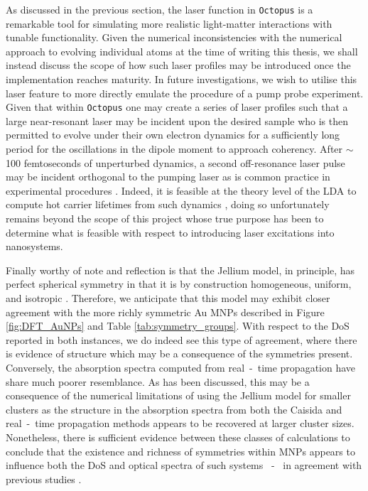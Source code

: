 As discussed in the previous section, the laser function in \texttt{Octopus} is a remarkable tool for simulating more realistic light-matter interactions with tunable functionality. Given the numerical inconsistencies with the numerical approach to evolving individual atoms at the time of writing this thesis, we shall instead discuss the scope of how such laser profiles may be introduced once the implementation reaches maturity. In future investigations, we wish to utilise this laser feature to more directly emulate the procedure of a pump probe experiment. Given that within \texttt{Octopus} one may create a series of laser profiles such that a large near-resonant laser may be incident upon the desired sample who is then permitted to evolve under their own electron dynamics for a sufficiently long period for the oscillations in the dipole moment to approach coherency. After $\sim$ 100 femtoseconds of unperturbed dynamics, a second off-resonance laser pulse may be incident orthogonal to the pumping laser as is common practice in experimental procedures \cite{https://doi.org/10.1002/lpor.202000346}. Indeed, it is feasible at the theory level of the LDA to compute hot carrier lifetimes from such dynamics \cite{https://doi.org/10.1002/lpor.202000346}, doing so unfortunately remains beyond the scope of this project whose true purpose has been to determine what is feasible with respect to introducing laser excitations into nanosystems. 

Finally worthy of note and reflection is that the Jellium model, in principle, has perfect spherical symmetry in that it is by construction homogeneous, uniform, and isotropic \cite{Jellium}. Therefore, we anticipate that this model may exhibit closer agreement with the more richly symmetric Au MNPs described in Figure \ref{fig:DFT_AuNPs} and Table \ref{tab:symmetry_groups}. With respect to the DoS reported in both instances, we do indeed see this type of agreement, where there is evidence of structure which may be a consequence of the symmetries present. Conversely, the absorption spectra computed from real~-~time propagation have share much poorer resemblance. As has been discussed, this may be a consequence of the numerical limitations of using the Jellium model for smaller clusters as the structure in the absorption spectra from both the Caisida and real~-~time propagation methods appears to be recovered at larger cluster sizes. Nonetheless, there is sufficient evidence between these classes of calculations to conclude that the existence and richness of symmetries within MNPs appears to influence both the DoS and optical spectra of such systems ~-~ in agreement with previous studies \cite{doi:10.1021/acs.jpca.8b07923}.

